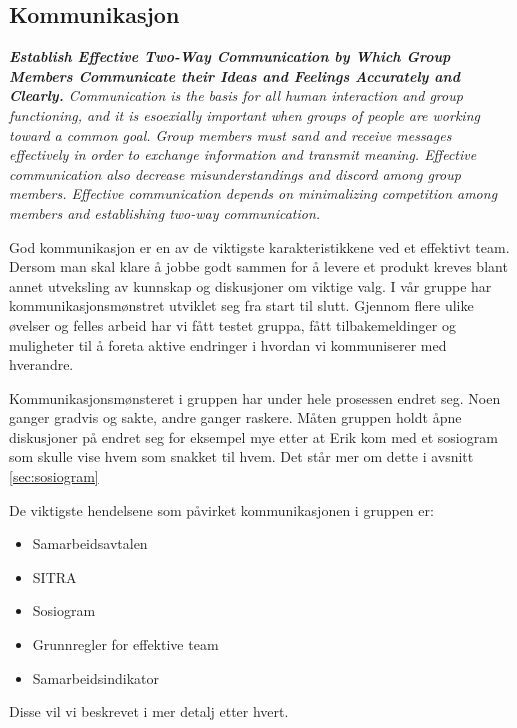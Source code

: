 \subsection{Kommunikasjon}


\textit{
\textbf{
Establish Effective Two-Way Communication by Which Group Members Communicate their Ideas and Feelings Accurately and Clearly.
}
Communication is the basis for all human interaction and group functioning, and it is esoexially important when groups of people are working toward a common goal.
Group members must sand and receive messages effectively in order to exchange information and transmit meaning.
Effective communication also decrease misunderstandings and discord among group members.
Effective communication depends on minimalizing competition among members and establishing two-way communication.
}
\cite{group_dynamics}

God kommunikasjon er en av de viktigste karakteristikkene ved et effektivt team.
Dersom man skal klare å jobbe godt sammen for å levere et produkt kreves blant annet utveksling av kunnskap og diskusjoner om viktige valg.
I vår gruppe har kommunikasjonsmønstret utviklet seg fra start til slutt.
Gjennom flere ulike øvelser og felles arbeid har vi fått testet gruppa, fått tilbakemeldinger og muligheter til å foreta aktive endringer i hvordan vi kommuniserer med hverandre.

Kommunikasjonsmønsteret i gruppen har under hele prosessen endret seg.
Noen ganger gradvis og sakte, andre ganger raskere.
Måten gruppen holdt åpne diskusjoner på endret seg for eksempel mye etter at Erik kom med et sosiogram som skulle vise hvem som snakket til hvem.
Det står mer om dette i avsnitt \ref{sec:sosiogram}

De viktigste hendelsene som påvirket kommunikasjonen i gruppen er:

\begin{itemize}
\item Samarbeidsavtalen
\item SITRA
\item Sosiogram
\item Grunnregler for effektive team
\item Samarbeidsindikator
\end{itemize}
Disse vil vi beskrevet i mer detalj etter hvert.

